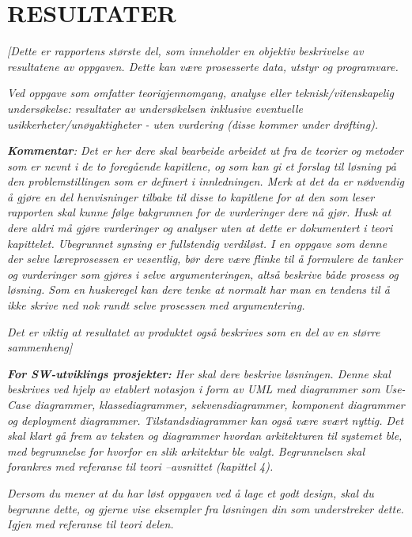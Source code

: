 \documentclass[../main.tex]{subfiles}
\begin{document}
\section{RESULTATER}

\bigskip

{\itshape\color{blue}
[Dette er rapportens st{\o}rste del, som inneholder en objektiv beskrivelse av resultatene av oppgaven. Dette kan
v{\ae}re prosesserte data, utstyr og programvare. }

{\itshape\color{blue}
Ved oppgave som omfatter teorigjennomgang, analyse eller teknisk/vitenskapelig unders{\o}kelse: resultater av
unders{\o}kelsen inklusive eventuelle usikkerheter/un{\o}yaktigheter - uten vurdering (disse kommer under
dr{\o}fting).}

{\itshape\color{blue}
\textbf{Kommentar}: Det er her dere skal bearbeide arbeidet ut fra de teorier og metoder som er nevnt i de to
foreg{\aa}ende kapitlene, og som kan gi et forslag til l{\o}sning p{\aa} den problemstillingen som er definert i
innledningen. Merk at det da er n{\o}dvendig {\aa} gj{\o}re en del henvisninger tilbake til disse to kapitlene for at
den som leser rapporten skal kunne f{\o}lge bakgrunnen for de vurderinger dere n{\aa} gj{\o}r. Husk at dere aldri
m{\aa} gj{\o}re vurderinger og analyser uten at dette er dokumentert i teori kapittelet. Ubegrunnet synsing er
fullstendig verdil{\o}st. I en oppgave som denne der selve l{\ae}reprosessen er vesentlig, b{\o}r dere v{\ae}re flinke
til {\aa} formulere de tanker og vurderinger som gj{\o}res i selve argumenteringen, alts{\aa} beskrive b{\aa}de prosess
og l{\o}sning. Som en huskeregel kan dere tenke at normalt har man en tendens til {\aa} ikke skrive ned nok rundt selve
prosessen med argumentering.}

{\itshape\color{blue}
Det er viktig at resultatet av produktet ogs{\aa} beskrives som en del av en st{\o}rre sammenheng]}

{\itshape\color{blue}
\textbf{For SW-utviklings prosjekter:} Her skal dere beskrive l{\o}sningen. Denne skal beskrives ved hjelp av etablert
notasjon i form av UML med diagrammer som Use-Case diagrammer, klassediagrammer, sekvensdiagrammer, komponent
diagrammer og deployment diagrammer. Tilstandsdiagrammer kan ogs{\aa} v{\ae}re sv{\ae}rt nyttig. Det skal klart g{\aa}
frem av teksten og diagrammer hvordan arkitekturen til systemet ble, med begrunnelse for hvorfor en slik arkitektur ble
valgt. Begrunnelsen skal forankres med referanse til teori --avsnittet (kapittel 4).}

{\itshape\color{blue}
Dersom du mener at du har l{\o}st oppgaven ved {\aa} lage et godt design, skal du begrunne dette, og gjerne vise
eksempler fra l{\o}sningen din som understreker dette. Igjen med referanse til teori delen. }
\end{document}
